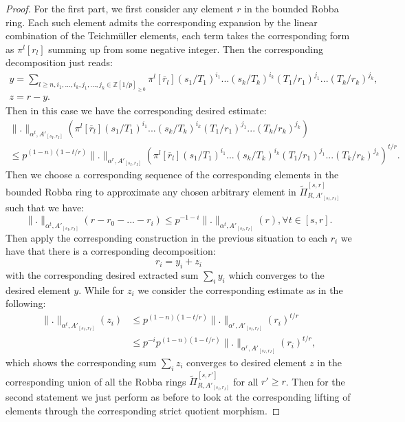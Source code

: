 \documentclass[12pt]{amsart}
\theoremstyle{definition}
\numberwithin{equation}{section}
\begin{document}
\begin{proof}
For the first part, we first consider any element $r$ in the bounded Robba ring. Each such element admits the corresponding expansion by the linear combination of the Teichm\"uller elements, each term takes the corresponding form as $\pi^l[r_{l}]$ summing up from some negative integer. Then the corresponding decomposition just reads:
\begin{align}
y=\sum_{l\geq n,i_1,...,i_k,j_1,...,j_k\in \mathbb{Z}[1/p]_{\geq 0}}\pi^l[\overline{r}_{l}](s_1/T_1)^{i_1}...(s_k/T_k)^{i_k}(T_1/r_1)^{j_1}...(T_k/r_k)^{j_k},\\
z=r-y.	
\end{align}
Then in this case we have the corresponding desired estimate:
\begin{align}
\|.\|_{\alpha^t,A'_{[s_I,r_I]}}(\pi^l[\overline{r}_{l}](s_1/T_1)^{i_1}...(s_k/T_k)^{i_k}(T_1/r_1)^{j_1}...(T_k/r_k)^{j_k})\\
\leq p^{(1-n)(1-t/r)}\|.\|_{\alpha^r,A'_{[s_I,r_I]}}(\pi^l[\overline{r}_{l}](s_1/T_1)^{i_1}...(s_k/T_k)^{i_k}(T_1/r_1)^{j_1}...(T_k/r_k)^{j_k})^{t/r}.
\end{align}
 Then we choose a corresponding sequence of the corresponding elements in the bounded Robba ring to approximate any chosen arbitrary element in $\widetilde{\Pi}^{[s,r]}_{R,A'_{[s_I,r_I]}}$ such that we have:
 \begin{displaymath}
 \|.\|_{\alpha^t,A'_{[s_I,r_I]}}(r-r_0-...-r_i)\leq p^{-1-i}  \|.\|_{\alpha^t,A'_{[s_I,r_I]}}(r),\forall t\in [s,r].	
 \end{displaymath}
Then apply the corresponding construction in the previous situation to each $r_i$ we have that there is a corresponding decomposition:
\begin{displaymath}
r_i=y_i+z_i	
\end{displaymath}
with the corresponding desired extracted sum $\sum_{i}y_i$ which converges to the desired element $y$. While for $z_i$ we consider the corresponding estimate as in the following:
\begin{align}
 \|.\|_{\alpha^t,A'_{[s_I,r_I]}}(z_i) &\leq  p^{(1-n)(1-t/r)}\|.\|_{\alpha^r,A'_{[s_I,r_I]}}(r_i)^{t/r}\\
 &\leq p^{-i}p^{(1-n)(1-t/r)}\|.\|_{\alpha^r,A'_{[s_I,r_I]}}(r_i)^{t/r},	
\end{align}
which shows the corresponding sum $\sum_i z_i$ converges to desired element $z$ in the corresponding union of all the Robba rings $\widetilde{\Pi}^{[s,r']}_{R,A'_{[s_I,r_I]}}$ for all $r'\geq r$. Then for the second statement we just perform as before to look at the corresponding lifting of elements through the corresponding strict quotient morphism.	
\end{proof}
\end{document}
